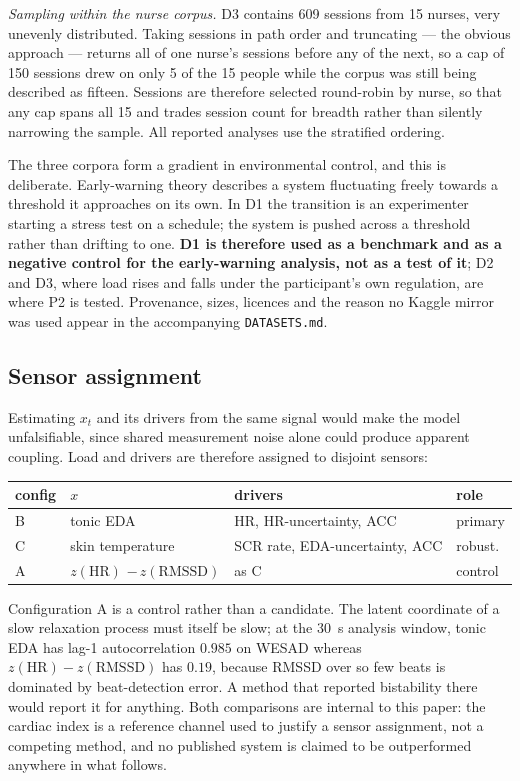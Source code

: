 \documentclass[conference]{IEEEtran}
\begin{document}
\emph{Sampling within the nurse corpus.} D3 contains 609 sessions from 15
nurses, very unevenly distributed. Taking sessions in path order and truncating
--- the obvious approach --- returns all of one nurse's sessions before any of
the next, so a cap of 150 sessions drew on only 5 of the 15 people while the
corpus was still being described as fifteen. Sessions are therefore selected
round-robin by nurse, so that any cap spans all 15 and trades session count for
breadth rather than silently narrowing the sample. All reported analyses use
the stratified ordering.

The three corpora form a gradient in environmental control, and this is
deliberate.
Early-warning theory describes a system fluctuating freely towards a threshold
it approaches on its own. In D1 the transition is an experimenter starting a
stress test on a schedule; the system is pushed across a threshold rather than
drifting to one. \textbf{D1 is therefore used as a benchmark and as a negative
control for the early-warning analysis, not as a test of it}; D2 and D3, where
load rises and falls under the participant's own regulation, are where P2 is
tested. Provenance, sizes, licences and the reason no Kaggle mirror was used
appear in the accompanying \texttt{DATASETS.md}.

\subsection{Sensor assignment}
\label{sec:sensors}
Estimating $x_t$ and its drivers from the same signal would make the model
unfalsifiable, since shared measurement noise alone could produce apparent
coupling. Load and drivers are therefore assigned to disjoint sensors:

\begin{center}
\footnotesize
\begin{tabular}{@{}l p{} p{} l@{}}
\toprule
config & $x$ & drivers & role\\
\midrule
B & tonic EDA & HR, HR-uncertainty, ACC & primary\\
C & skin temperature & SCR rate, EDA-uncertainty, ACC & robust.\\
A & $z(\mathrm{HR})$ ${-}\,z(\mathrm{RMSSD})$ & as C & control\\
\bottomrule
\end{tabular}
\end{center}

\noindent Configuration A is a control rather than a candidate. The latent
coordinate of a slow relaxation process must itself be slow; at the
\SI{30}{\second} analysis window, tonic EDA has lag-1 autocorrelation
$0.985$ on WESAD whereas $z(\mathrm{HR})-z(\mathrm{RMSSD})$ has $0.19$,
because RMSSD over so few beats is dominated by beat-detection error. A method
that reported bistability there would report it for anything. Both comparisons
are internal to this paper: the cardiac index is a reference channel used to
justify a sensor assignment, not a competing method, and no published system is
claimed to be outperformed anywhere in what follows.
\end{document}
